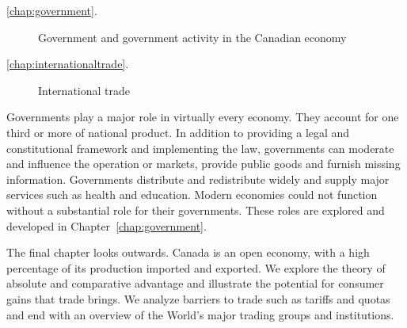 
{\large\color{parttextcolour}
\begin{description}
\item[\textmd{\ref{chap:government}.}] Government and government activity in the Canadian economy

\item[\textmd{\ref{chap:internationaltrade}.}] International trade
\end{description}
}

\vspace{1cm}

Governments play a major role in virtually every economy. They account for one third or more of national product. In addition to providing a legal and constitutional framework and implementing the law, governments can moderate and influence the operation or markets, provide public goods and furnish missing information. Governments distribute and redistribute widely and supply major services such as health and education. Modern economies could not function without a substantial role for their governments. These roles are explored and developed in Chapter~\ref{chap:government}.

The final chapter looks outwards. Canada is an open economy, with a high percentage of its production imported and exported. We explore the theory of absolute and comparative advantage and illustrate the potential for consumer gains that trade brings. We analyze barriers to trade such as tariffs and quotas and end with an overview of the World's major trading groups and institutions.

